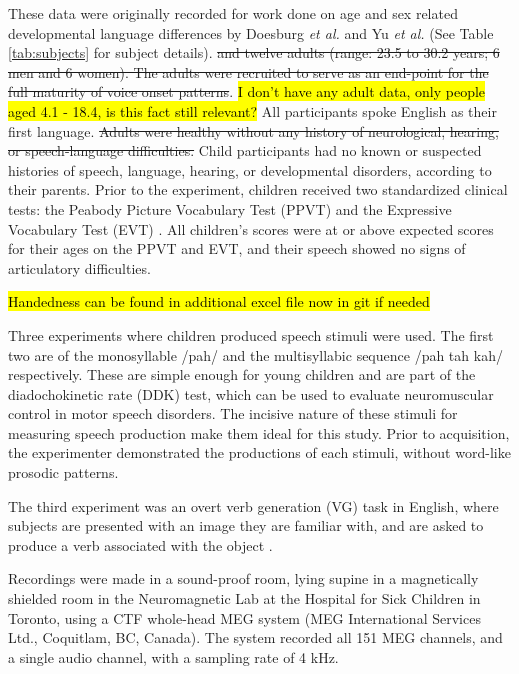 \documentclass[a4paper]{article}
\newcommand{\DK}[1]{{\small \textcolor{blue}{\hl{#1}}}}
\begin{document}
These data were originally recorded for work done on age and sex related developmental language differences by Doesburg \emph{et al.} and Yu \emph{et al.} \cite{Doesburg2016, Yu2014} (See Table \ref{tab:subjects} for subject details). \st{and twelve adults (range: 23.5 to 30.2 years; 6 men and 6 women). The adults were recruited to serve as an end-point for the full maturity of voice onset patterns}. \DK{I don't have any adult data, only people aged 4.1 - 18.4, is this fact still relevant?} All participants spoke English as their first language. \st{Adults were healthy without any history of neurological, hearing, or speech-language difficulties.} Child participants had no known or suspected histories of speech, language, hearing, or developmental disorders, according to their parents. Prior to the experiment, children received two standardized clinical tests: the Peabody Picture Vocabulary Test (PPVT) \cite{Dunn97} and the Expressive Vocabulary Test (EVT) \cite{EVT}. All children's scores were at or above expected scores for their ages on the PPVT and EVT, and their speech showed no signs of articulatory difficulties.

\DK{Handedness can be found in additional excel file now in git if needed}

Three experiments where children produced speech stimuli were used. The first two are of the monosyllable /pah/ and the multisyllabic sequence /pah tah kah/ respectively. These are simple enough for young children and are part of the diadochokinetic rate (DDK) test, which can be used to evaluate neuromuscular control in motor speech disorders. The incisive nature of these stimuli for measuring speech production make them ideal for this study. Prior to acquisition, the experimenter demonstrated the productions of each stimuli, without word-like prosodic patterns.

The third experiment was an overt verb generation (VG) task in English, where subjects are presented with an image they are familiar with, and are asked to produce a verb associated with the object \cite{Doesburg2016}.

Recordings were made in a sound-proof room, lying supine in a magnetically shielded room in the Neuromagnetic Lab at the Hospital for Sick Children in Toronto, using a CTF whole-head MEG system (MEG International Services Ltd., Coquitlam, BC, Canada). The system recorded all 151 MEG channels, and a single audio channel, with a sampling rate of 4 kHz. %
\end{document}
